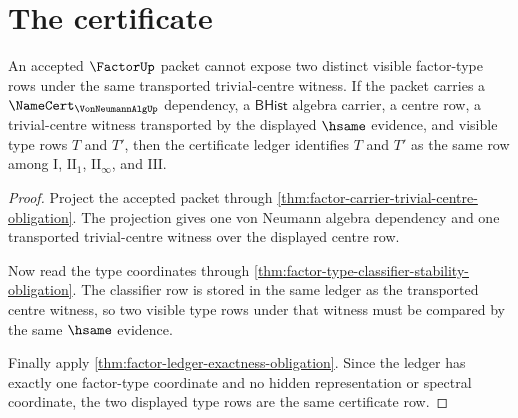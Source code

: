 \section{The certificate}
\label{sec:factor-certificate}

\begin{theorem}
\label{thm:factor-type-row-no-confusion}
An accepted $\FactorUp$ packet cannot expose two distinct visible factor-type
rows under the same transported trivial-centre witness. If the packet carries a
$\NameCert_{\VonNeumannAlgUp}$ dependency, a $\mathsf{BHist}$ algebra carrier,
a centre row, a trivial-centre witness transported by the displayed $\hsame$
evidence, and visible type rows $T$ and $T'$, then the certificate ledger
identifies $T$ and $T'$ as the same row among $\mathrm{I}$, $\mathrm{II}_1$,
$\mathrm{II}_\infty$, and $\mathrm{III}$.
\end{theorem}
\begin{proof}
Project the accepted packet through
\autoref{thm:factor-carrier-trivial-centre-obligation}. The projection gives one
von Neumann algebra dependency and one transported trivial-centre witness over
the displayed centre row.

Now read the type coordinates through
\autoref{thm:factor-type-classifier-stability-obligation}. The classifier row is
stored in the same ledger as the transported centre witness, so two visible type
rows under that witness must be compared by the same $\hsame$ evidence.

Finally apply \autoref{thm:factor-ledger-exactness-obligation}. Since the ledger
has exactly one factor-type coordinate and no hidden representation or spectral
coordinate, the two displayed type rows are the same certificate row.
\end{proof}

